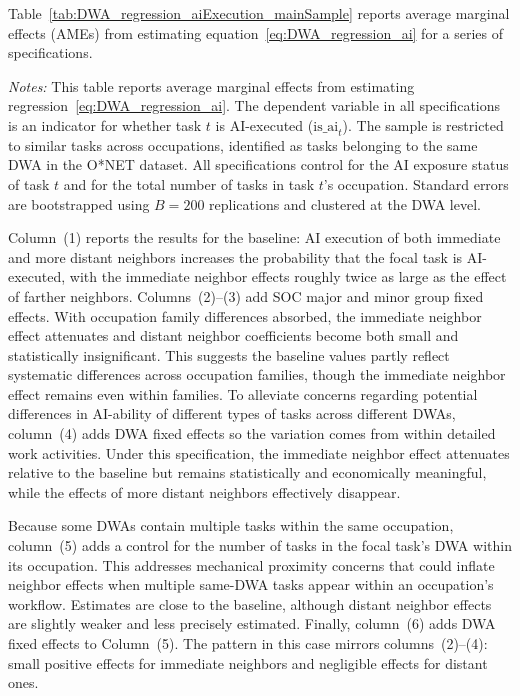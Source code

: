 Table~\ref{tab:DWA_regression_aiExecution_mainSample} reports average marginal effects (AMEs) from estimating equation~\eqref{eq:DWA_regression_ai} for a series of specifications.
\begin{table}[t!]
\begin{center}
\caption{Effect of Neighboring Tasks' AI Execution Status on Task's AI Execution Likelihood}
\label{tab:DWA_regression_aiExecution_mainSample}
\resizebox{\textwidth}{!}{

}
\end{center}
\raggedright \footnotesize{\emph{Notes:}}
This table reports average marginal effects from estimating regression~\eqref{eq:DWA_regression_ai}.
The dependent variable in all specifications is an indicator for whether task $t$ is AI-executed ($\text{is\_ai}_{t}$).
The sample is restricted to similar tasks across occupations, identified as tasks belonging to the same DWA in the O*NET dataset.
All specifications control for the AI exposure status of task $t$ and for the total number of tasks in task $t$'s occupation.
Standard errors are bootstrapped using $B=200$ replications and clustered at the DWA level.
\end{table}
Column~(1) reports the results for the baseline: AI execution of both immediate and more distant neighbors increases the probability that the focal task is AI-executed, with the immediate neighbor effects roughly twice as large as the effect of farther neighbors.
Columns~(2)--(3) add SOC major and minor group fixed effects.
With occupation family differences absorbed, the immediate neighbor effect attenuates and distant neighbor coefficients become both small and statistically insignificant.
This suggests the baseline values partly reflect systematic differences across occupation families, though the immediate neighbor effect remains even within families.
To alleviate concerns regarding potential differences in AI-ability of different types of tasks across different DWAs, column~(4) adds DWA fixed effects so the variation comes from within detailed work activities.
Under this specification, the immediate neighbor effect attenuates relative to the baseline but remains statistically and economically meaningful, while the effects of more distant neighbors effectively disappear.

Because some DWAs contain multiple tasks within the same occupation, column~(5) adds a control for the number of tasks in the focal task's DWA within its occupation.
This addresses mechanical proximity concerns that could inflate neighbor effects when multiple same-DWA tasks appear within an occupation's workflow.
Estimates are close to the baseline, although distant neighbor effects are slightly weaker and less precisely estimated.
Finally, column~(6) adds DWA fixed effects to Column~(5).
The pattern in this case mirrors columns~(2)--(4): small positive effects for immediate neighbors and negligible effects for distant ones.

